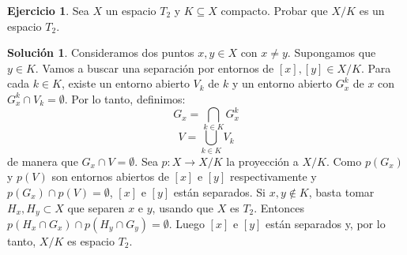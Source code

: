\documentclass{article}
\theoremstyle{plain}
\theoremstyle{definition}
\newtheorem{exercise}{Ejercicio}
\newtheorem*{sol*}{Solución}
\begin{document}
\newpage
\begin{exercise}
Sea $X$ un espacio $T_2$ y $K \subseteq X$ compacto. Probar que $X/K$ es un espacio $T_2$.
\end{exercise}
\begin{sol*}
Consideramos dos puntos $x, y \in X$ con $x \neq y$. Supongamos que $y\in K$. Vamos a buscar una separación por entornos de $[x],[y] \in X/K$. Para cada $k \in K$, existe un entorno abierto $V_k$ de $k$ y un entorno abierto $G^k_x$ de $x$ con $G^k_x \cap V_k = \emptyset$. Por lo tanto, definimos:
\[ G_x = \bigcap_{k \in K} G^k_x \]
\[ V = \bigcup_{k \in K} V_k \]
de manera que $G_x \cap V = \emptyset$. Sea $p : X \to X/K$ la proyección a $X/K$. Como $p(G_x)$ y $p(V)$ son entornos abiertos de $[x]$ e $[y]$ respectivamente y $p(G_x) \cap p(V) = \emptyset$, $[x]$ e $[y]$ están separados. Si $x,y \notin K$, basta tomar $H_x, H_y \subset X$ que separen $x$ e $y$, usando que $X$ es $T_2$. Entonces $p(H_x \cap G_x) \cap p(H_y \cap G_y) = \emptyset$. Luego $[x]$ e $[y]$ están separados y, por lo tanto, $X/K$ es espacio $T_2$.
\end{sol*}
\end{document}
